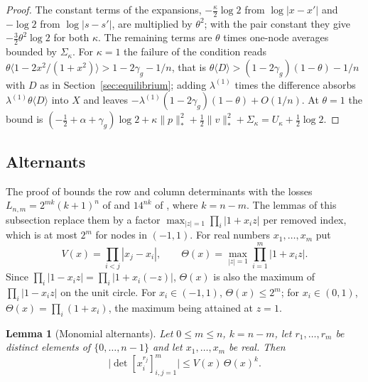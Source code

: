 \documentclass[11pt]{article}
\newtheorem{lemma}[theorem]{Lemma}
\theoremstyle{definition}
\begin{document}
\begin{proof}
The constant terms of the expansions, $-\frac\kappa2\log2$ from $\log|x-x'|$ and $-\log2$ from $\log|s-s'|$, are multiplied by $\theta^2$; with the pair constant they give $-\frac32\theta^2\log2$ for both $\kappa$. The remaining terms are $\theta$ times one-node averages bounded by $\Sigma_\kappa$. For $\kappa=1$ the failure of the condition reads $\theta\langle1-2x^2/(1+x^2)\rangle>1-2\gamma_g-1/n$, that is $\theta\langle D\rangle>(1-2\gamma_g)(1-\theta)-1/n$ with $D$ as in Section~\ref{sec:equilibrium}; adding $\lambda^{(1)}$ times the difference absorbs $\lambda^{(1)}\theta\langle D\rangle$ into $X$ and leaves $-\lambda^{(1)}(1-2\gamma_g)(1-\theta)+O(1/n)$. At $\theta=1$ the bound is $(-\frac12+\alpha+\gamma_g)\log2+\kappa\|p\|_*^2+\frac12\|v\|_*^2+\Sigma_\kappa=U_\kappa+\frac12\log2$.
\end{proof}

\subsection{Alternants}\label{xsec:alt}

The proof of \cite[Theorem~6.3]{Jha} bounds the row and column determinants with the losses $L_{n,m}=2^{mk}(k+1)^n$ of \cite[Lemma~4.1, Corollary~4.2]{Jha} and $14^{nk}$ of \cite[Lemma~4.5]{Jha}, where $k=n-m$. The lemmas of this subsection replace them by a factor $\max_{|z|=1}\prod_i|1+x_iz|$ per removed index, which is at most $2^m$ for nodes in $(-1,1)$. For real numbers $x_1,\dots,x_m$ put
\[
V(x)=\prod_{i<j}|x_j-x_i|,\qquad \Theta(x)=\max_{|z|=1}\prod_{i=1}^m|1+x_iz| .
\]
Since $\prod_i|1-x_iz|=\prod_i|1+x_i(-z)|$, $\Theta(x)$ is also the maximum of $\prod_i|1-x_iz|$ on the unit circle. For $x_i\in(-1,1)$, $\Theta(x)\le2^m$; for $x_i\in(0,1)$, $\Theta(x)=\prod_i(1+x_i)$, the maximum being attained at $z=1$.

\begin{lemma}[Monomial alternants]\label{xlem:schur}
Let $0\le m\le n$, $k=n-m$, let $r_1,\dots,r_m$ be distinct elements of $\{0,\dots,n-1\}$ and let $x_1,\dots,x_m$ be real. Then
\[
\big|\det[x_i^{r_j}]_{i,j=1}^m\big|\le V(x)\,\Theta(x)^k .
\]
\end{lemma}
\end{document}
